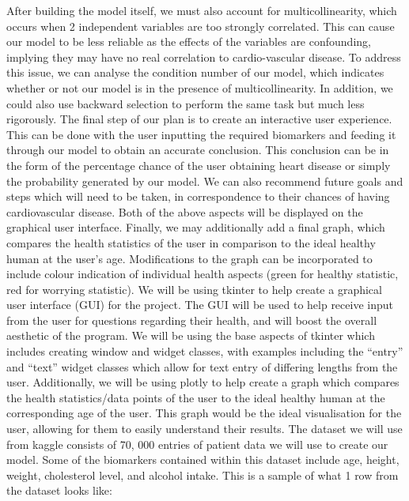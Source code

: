 \documentclass[fontsize=11pt]{article}
\begin{document}
After building the model itself, we must also account for multicollinearity, which occurs when 2 independent variables are too strongly correlated. This can cause our model to be less reliable as the effects of the variables are confounding, implying they may have no real correlation to cardio-vascular disease. To address this issue, we can analyse the condition number of our model, which indicates whether or not our model is in the presence of multicollinearity. In addition, we could also use backward selection to perform the same task but much less rigorously. 
\newline
\newline
The final step of our plan is to create an interactive user experience. This can be done with the user inputting the required biomarkers and feeding it through our model to obtain an accurate conclusion. This conclusion can be in the form of the percentage chance of the user obtaining heart disease or simply the probability generated by our model. We can also recommend future goals and steps which will need to be taken, in correspondence to their chances of having cardiovascular disease. Both of the above aspects will be displayed on the graphical user interface. Finally, we may additionally add a final graph, which compares the health statistics of the user in comparison to the ideal healthy human at the user’s age. Modifications to the graph can be incorporated to include colour indication of individual health aspects (green for healthy statistic, red for worrying statistic). We will be using tkinter to help create a graphical user interface (GUI) for the project. The GUI will be used to help receive input from the user for questions regarding their health, and will boost the overall aesthetic of the program. We will be using the base aspects of tkinter which includes creating window and widget classes, with examples including the “entry” and “text” widget classes which allow for text entry of differing lengths from the user. Additionally, we will be using plotly to help create a graph which compares the health statistics/data points of the user to the ideal healthy human at the corresponding age of the user. This graph would be the ideal visualisation for the user, allowing for them to easily understand their results. 
\newline
\newline
The dataset we will use from kaggle consists of 70, 000 entries of patient data we will use to create our model. Some of the biomarkers contained within this dataset include age, height, weight, cholesterol level, and alcohol intake. This is a sample of what 1 row from the dataset looks like:
\end{document}
